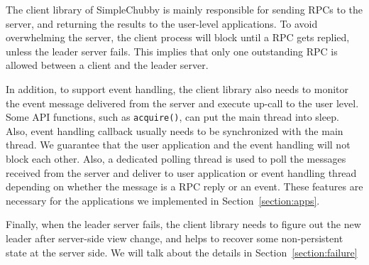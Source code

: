 The client library of SimpleChubby is mainly responsible for sending RPCs to the
server, and returning the results to the user-level applications.
To avoid overwhelming the server, the client process will block until a RPC
gets replied, unless the leader server fails. This implies that only one
outstanding RPC is allowed between a client and the leader server.

In addition, to support event handling, the client library also needs to
monitor the event message delivered from the server and execute up-call
to the user level. Some API functions, such as \texttt{acquire()}, can put
the main thread into sleep. Also, event handling callback usually needs to
be synchronized with the main thread. We guarantee that the user application
and the event handling will not block each other. Also, a dedicated polling
thread is used to poll the messages received from the server and deliver to
user application or event handling thread depending on whether the message
is a RPC reply or an event. These features are necessary
for the applications we implemented in Section~\ref{section:apps}.

Finally, when the leader server fails, the client library needs to figure out
the new leader after server-side view change, and helps to recover some
non-persistent state at the server side. We will talk about the details in
Section~\ref{section:failure}




